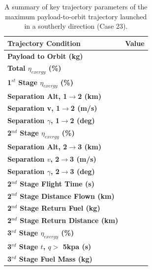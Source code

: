 \begin{table}[!ht]
	\centering
	\begin{tabular}{l c} 
		\hline \textbf{Trajectory Condition}
		& Value

		\\
		\hline \textbf{Payload to Orbit (kg)}
		& \textbf{\PayloadToOrbitAlternate}
		\\
		\textbf{Total $\eta_{exergy}$ (\%)}
		& \textbf{\totalExergyEffAlternate}
		\\
		\hline 
		\textbf{1$^{st}$ Stage $\eta_{exergy}$ (\%)}
		& \textbf{\firstExergyEffAlternate}
		\\
		\textbf{Separation Alt, 1$\rightarrow$2 (km)}
		& \firstsecondSeparationAltAlternate
		\\
		\textbf{Separation v, 1$\rightarrow$2 (m/s)}
		& \firstsecondSeparationvAlternate
		\\
		\textbf{Separation $\gamma$, 1$\rightarrow$2 (deg)}
		& \firstsecondSeparationgammaAlternate
		\\
		\hline 
		\textbf{2$^{nd}$ Stage $\eta_{exergy}$ (\%)}
		& \textbf{\secondExergyEffAlternate}
		\\
		\textbf{Separation Alt, 2$\rightarrow$3 (km)}
		& \secondthirdSeparationAltAlternate
		\\
		\textbf{Separation $v$, 2$\rightarrow$3 (m/s)}
		& \secondthirdSeparationvAlternate
		\\
		\textbf{Separation $\gamma$, 2$\rightarrow$3 (deg)}
		& \secondthirdSeparationgammaAlternate
		\\
		\textbf{2$^{nd}$ Stage Flight Time (s)}
		& \secondFlightTimeAlternate
		\\
		\textbf{2$^{nd}$ Stage Distance Flown (km)}
		& \SecondDistAlternate
		\\
		\textbf{2$^{nd}$ Stage Return Fuel (kg)}
		& \returnFuelAlternate
		\\
		\textbf{2$^{nd}$ Stage Return Distance (km)}
		& \returnDistAlternate
		\\
		\hline 
		\textbf{3$^{rd}$ Stage $\eta_{exergy}$ (\%)}
		& \textbf{\thirddExergyEffAlternate}
		\\
		\textbf{3$^{rd}$ Stage $t$, $q >$ 5kpa (s)}
		& \thirdqOverFiveAlternate
		\\
		\textbf{3$^{rd}$ Stage Fuel Mass (kg)}
		& \thirdmFuelAlternate
		\\
		\hline 
	\end{tabular} 
	\caption{A summary of key trajectory parameters of the maximum payload-to-orbit trajectory launched in a southerly direction (Case 23).}
	\label{tab:summaryalternate}
\end{table}
